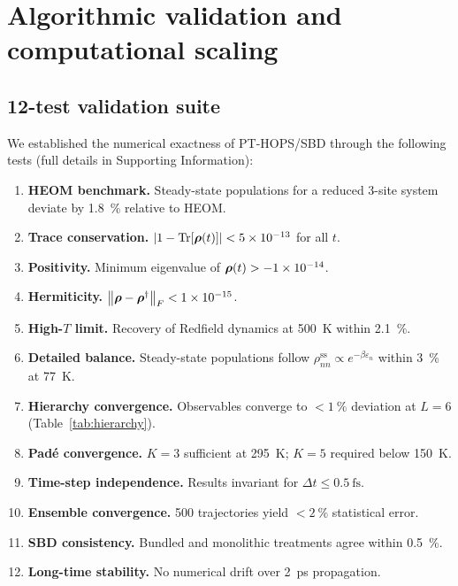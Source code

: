 \documentclass[journal=jctc,manuscript=article]{achemso}
\begin{document}
\section{Algorithmic validation and computational scaling}

\subsection{12-test validation suite}
We established the numerical exactness of PT-HOPS/SBD through the following tests (full details in Supporting Information):

\begin{enumerate}
\item \textbf{HEOM benchmark.} Steady-state populations for a reduced 3-site system deviate by \SI{1.8}{\percent} relative to HEOM.\cite{Ishizaki2009a}
\item \textbf{Trace conservation.} $\abs{1 - \Tr[\vb*{\rho}(t)]} < \num{5e-13}$ for all $t$.
\item \textbf{Positivity.} Minimum eigenvalue of $\vb*{\rho}(t) > \num{-1e-14}$.
\item \textbf{Hermiticity.} $\norm{\vb*{\rho} - \vb*{\rho}^\dagger}_F < \num{1e-15}$.
\item \textbf{High-$T$ limit.} Recovery of Redfield dynamics at \SI{500}{\kelvin} within \SI{2.1}{\percent}.
\item \textbf{Detailed balance.} Steady-state populations follow $\rho_{nn}^{\mathrm{ss}} \propto e^{-\beta\varepsilon_n}$ within \SI{3}{\percent} at \SI{77}{\kelvin}.
\item \textbf{Hierarchy convergence.} Observables converge to $< \SI{1}{\percent}$ deviation at $L = 6$ (Table~\ref{tab:hierarchy}).
\item \textbf{Padé convergence.} $K = 3$ sufficient at \SI{295}{\kelvin}; $K = 5$ required below \SI{150}{\kelvin}.
\item \textbf{Time-step independence.} Results invariant for $\Delta t \leq \SI{0.5}{\femto\second}$.
\item \textbf{Ensemble convergence.} \num{500} trajectories yield $< \SI{2}{\percent}$ statistical error.
\item \textbf{SBD consistency.} Bundled and monolithic treatments agree within \SI{0.5}{\percent}.
\item \textbf{Long-time stability.} No numerical drift over \SI{2}{\pico\second} propagation.
\end{enumerate}
\end{document}
